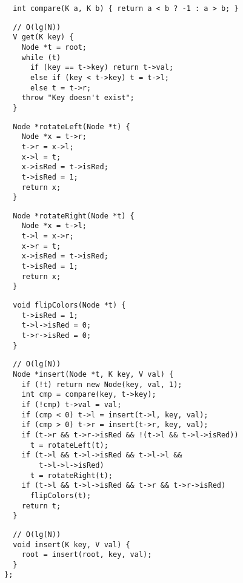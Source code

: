 \documentclass[twoside]{article}
\newcommand{\fileTitleStyle}{\large\underline}
\begin{document}
\begin{multicols*}{2}
\begin{verbatim}
  int compare(K a, K b) { return a < b ? -1 : a > b; }
\end{verbatim}
\vspace{-12pt}
\begin{verbatim}
  // O(lg(N))
  V get(K key) {
    Node *t = root;
    while (t)
      if (key == t->key) return t->val;
      else if (key < t->key) t = t->l;
      else t = t->r;
    throw "Key doesn't exist";
  }
\end{verbatim}
\vspace{-12pt}
\begin{verbatim}
  Node *rotateLeft(Node *t) {
    Node *x = t->r;
    t->r = x->l;
    x->l = t;
    x->isRed = t->isRed;
    t->isRed = 1;
    return x;
  }
\end{verbatim}
\vspace{-12pt}
\begin{verbatim}
  Node *rotateRight(Node *t) {
    Node *x = t->l;
    t->l = x->r;
    x->r = t;
    x->isRed = t->isRed;
    t->isRed = 1;
    return x;
  }
\end{verbatim}
\vspace{-12pt}
\begin{verbatim}
  void flipColors(Node *t) {
    t->isRed = 1;
    t->l->isRed = 0;
    t->r->isRed = 0;
  }
\end{verbatim}
\vspace{-12pt}
\begin{verbatim}
  // O(lg(N))
  Node *insert(Node *t, K key, V val) {
    if (!t) return new Node(key, val, 1);
    int cmp = compare(key, t->key);
    if (!cmp) t->val = val;
    if (cmp < 0) t->l = insert(t->l, key, val);
    if (cmp > 0) t->r = insert(t->r, key, val);
    if (t->r && t->r->isRed && !(t->l && t->l->isRed))
      t = rotateLeft(t);
    if (t->l && t->l->isRed && t->l->l &&
        t->l->l->isRed)
      t = rotateRight(t);
    if (t->l && t->l->isRed && t->r && t->r->isRed)
      flipColors(t);
    return t;
  }
\end{verbatim}
\vspace{-12pt}
\begin{verbatim}
  // O(lg(N))
  void insert(K key, V val) {
    root = insert(root, key, val);
  }
};
\end{verbatim}

\subsectionfont{\centering\bfseries\LARGE}
\subsectionfont{\fileTitleStyle}

\end{multicols*}
\end{document}
